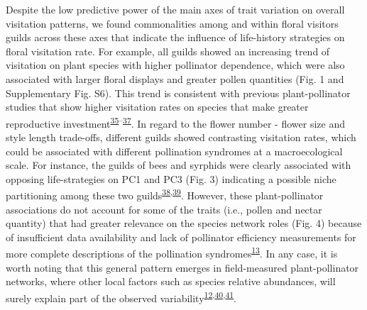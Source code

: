 \documentclass[12pt,a4paper,]{article}
\begin{document}
Despite the low predictive power of the main axes of trait variation on
overall visitation patterns, we found commonalities among and within
floral visitors guilds across these axes that indicate the influence of
life-history strategies on floral visitation rate. For example, all
guilds showed an increasing trend of visitation on plant species with
higher pollinator dependence, which were also associated with larger
floral displays and greater pollen quantities (Fig. 1 and Supplementary
Fig. S6). This trend is consistent with previous plant-pollinator
studies that show higher visitation rates on species that make greater
reproductive
investment\textsuperscript{\protect\hyperlink{ref-hegland2005}{35}--\protect\hyperlink{ref-kaiser2014}{37}}.
In regard to the flower number - flower size and style length
trade-offs, different guilds showed contrasting visitation rates, which
could be associated with different pollination syndromes at a
macroecological scale. For instance, the guilds of bees and syrphids
were clearly associated with opposing life-strategies on PC1 and PC3
(Fig. 3) indicating a possible niche partitioning among these two
guilds\textsuperscript{\protect\hyperlink{ref-palmer2003}{38},\protect\hyperlink{ref-phillips2020}{39}}.
However, these plant-pollinator associations do not account for some of
the traits (i.e., pollen and nectar quantity) that had greater relevance
on the species network roles (Fig. 4) because of insufficient data
availability and lack of pollinator efficiency measurements for more
complete descriptions of the pollination
syndromes\textsuperscript{\protect\hyperlink{ref-dellinger2020}{13}}. In
any case, it is worth noting that this general pattern emerges in
field-measured plant-pollinator networks, where other local factors such
as species relative abundances, will surely explain part of the observed
variability\textsuperscript{\protect\hyperlink{ref-bartomeus2016}{12},\protect\hyperlink{ref-vazquez2007}{40},\protect\hyperlink{ref-encinas2012}{41}}.
\end{document}
